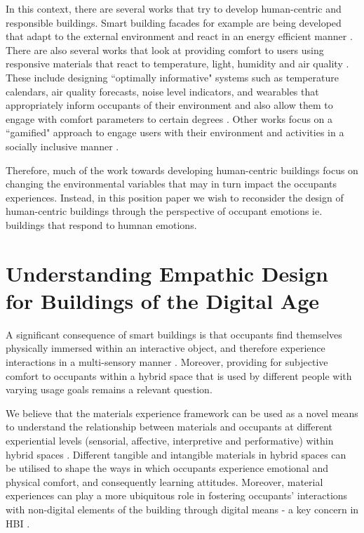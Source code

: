 \documentclass[manuscript, anonymous, review]{acmart}
\begin{document}
In this context, there are several works that try to develop human-centric and responsible buildings. Smart building facades for example are being developed that adapt to the external environment and react in an energy efficient manner \cite{ahmed2015development}. There are also several works that look at providing comfort to users using responsive materials that react to temperature, light, humidity and air quality \cite{fragkia2020exergy, holstov2015hygromorphic, kroner1997intelligent}. These include designing ``optimally informative" systems such as temperature calendars, air quality forecasts, noise level indicators, and wearables that appropriately inform occupants of their environment and also allow them to engage with comfort parameters to certain degrees  \cite{costanza2016bit, milenkovic2013improving, kim2020designing}. Other works focus on a ``gamified" approach to engage users with their environment and activities in a socially inclusive manner \cite{mathur2015tiny, kwallek1997impact, zhong2022augmenting}. 

Therefore, much of the work towards developing human-centric buildings focus on changing the environmental variables that may in turn impact the occupants experiences. Instead, in this position paper we wish to reconsider the design of human-centric buildings through the perspective of occupant emotions ie. buildings that respond to humnan emotions.


\section{Understanding Empathic Design for Buildings of the Digital Age}

A significant consequence of smart buildings is that occupants find themselves physically immersed within an interactive object, and therefore experience interactions in a multi-sensory manner \cite{nembrini2017human}. Moreover, providing for subjective comfort to occupants within a hybrid space that is used by different people with varying usage goals remains a relevant question. 

We believe that the materials experience framework can be used as a novel means to understand the relationship between materials and occupants at different experiential levels (sensorial, affective, interpretive and performative) within hybrid spaces \cite{giaccardi2015foundations}. Different tangible and intangible materials in hybrid spaces can be utilised to shape the ways in which occupants experience emotional and physical comfort, and consequently learning attitudes. Moreover, material
experiences can play a more ubiquitous role in fostering occupants' interactions with non-digital elements of the building through digital means - a key concern in HBI \cite{nembrini2017human}. 
\end{document}
